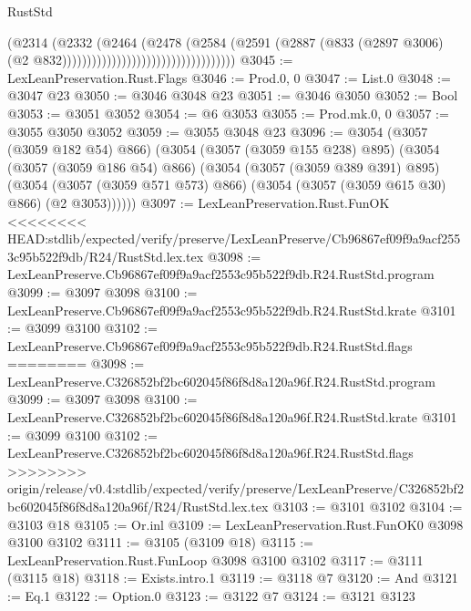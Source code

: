 \begin{lexlean}{RustStd}
\begin{coremodule}
{\begin{coremodule}
{{{{{{{{{{{{{{{{{{{{{{{{{{                                                        (@2314
                                                          (@2332
                                                            (@2464
                                                              (@2478
                                                                (@2584
                                                                  (@2591
                                                                    (@2887
                                                                      (@833
                                                                        (@2897 @3006)
                                                                        (@2
                                                                          @832)))))))))))))))))))))))))))))))))))
@3045 := LexLeanPreservation.Rust.Flags
@3046 := Prod.{0, 0}
@3047 := List.{0}
@3048 := @3047 @23
@3050 := @3046 @3048 @23
@3051 := @3046 @3050
@3052 := Bool
@3053 := @3051 @3052
@3054 := @6 @3053
@3055 := Prod.mk.{0, 0}
@3057 := @3055 @3050 @3052
@3059 := @3055 @3048 @23
@3096 := @3054
    (@3057 (@3059 @182 @54) @866)
    (@3054
      (@3057 (@3059 @155 @238) @895)
      (@3054
        (@3057 (@3059 @186 @54) @866)
        (@3054
          (@3057 (@3059 @389 @391) @895)
          (@3054 (@3057 (@3059 @571 @573) @866) (@3054 (@3057 (@3059 @615 @30) @866) (@2 @3053))))))
@3097 := LexLeanPreservation.Rust.FunOK
<<<<<<<< HEAD:stdlib/expected/verify/preserve/LexLeanPreserve/Cb96867ef09f9a9acf2553c95b522f9db/R24/RustStd.lex.tex
@3098 := LexLeanPreserve.Cb96867ef09f9a9acf2553c95b522f9db.R24.RustStd.program
@3099 := @3097 @3098
@3100 := LexLeanPreserve.Cb96867ef09f9a9acf2553c95b522f9db.R24.RustStd.krate
@3101 := @3099 @3100
@3102 := LexLeanPreserve.Cb96867ef09f9a9acf2553c95b522f9db.R24.RustStd.flags
========
@3098 := LexLeanPreserve.C326852bf2bc602045f86f8d8a120a96f.R24.RustStd.program
@3099 := @3097 @3098
@3100 := LexLeanPreserve.C326852bf2bc602045f86f8d8a120a96f.R24.RustStd.krate
@3101 := @3099 @3100
@3102 := LexLeanPreserve.C326852bf2bc602045f86f8d8a120a96f.R24.RustStd.flags
>>>>>>>> origin/release/v0.4:stdlib/expected/verify/preserve/LexLeanPreserve/C326852bf2bc602045f86f8d8a120a96f/R24/RustStd.lex.tex
@3103 := @3101 @3102
@3104 := @3103 @18
@3105 := Or.inl
@3109 := LexLeanPreservation.Rust.FunOK0 @3098 @3100 @3102
@3111 := @3105 (@3109 @18)
@3115 := LexLeanPreservation.Rust.FunLoop @3098 @3100 @3102
@3117 := @3111 (@3115 @18)
@3118 := Exists.intro.{1}
@3119 := @3118 @7
@3120 := And
@3121 := Eq.{1}
@3122 := Option.{0}
@3123 := @3122 @7
@3124 := @3121 @3123
}}}}}}}}}}}}}}}}}}}}}}}}}}
\end{coremodule}}
\end{coremodule}
\end{lexlean}
